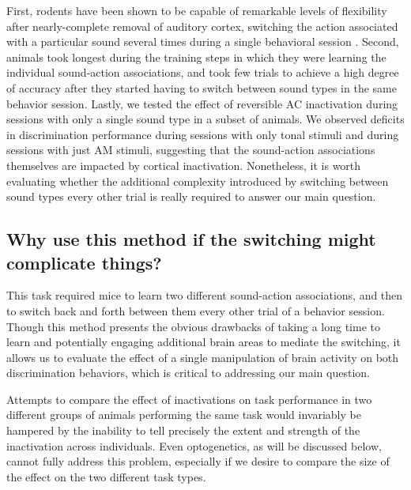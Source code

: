 First, rodents have been shown to be capable of remarkable levels of
flexibility after nearly-complete removal of auditory cortex, switching the
action associated with a particular sound several times during a single
behavioral session \citep{Gimenez2015}.
%
Second, animals took longest during the training steps in which they were
learning the individual sound-action associations, and took few trials to
achieve a high degree of accuracy after they started having to switch between
sound types in the same behavior session.
Lastly, we tested the effect of reversible AC inactivation during sessions with
only a single sound type in a subset of animals.
%
We observed deficits in discrimination performance during sessions with only
tonal stimuli and during sessions with just AM stimuli, suggesting that the
sound-action associations themselves are impacted by cortical inactivation.
%
Nonetheless, it is worth evaluating whether the additional complexity
introduced by switching between sound types every other trial is really
required to answer our main question. 

\subsection{Why use this method if the switching might complicate things?}

%
This task required mice to learn two different sound-action associations, and
then to switch back and forth between them every other trial of a behavior
session.
%
Though this method presents the obvious drawbacks of taking a long time to
learn and potentially engaging additional brain areas to mediate the switching,
it allows us to evaluate the effect of a single manipulation of brain activity
on both discrimination behaviors, which is critical to addressing our main
question.

Attempts to compare the effect of inactivations on task performance in two
different groups of animals performing the same task would invariably be
hampered by the inability to tell precisely the extent and strength of the
inactivation across individuals.
%
Even optogenetics, as will be discussed below, cannot fully address this
problem, especially if we desire to compare the size of the effect on the two
different task types.

